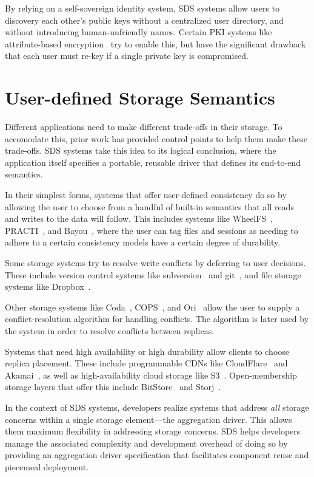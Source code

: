 By relying on a self-sovereign identity system, SDS systems allow users to
discovery each other's public keys without a centralized user directory, and
without introducing human-unfriendly names.  Certain PKI systems like
attribute-based encryption~\cite{abe} try to enable this, but have the significant
drawback that each user must re-key if a single private key is compromised.

\section{User-defined Storage Semantics}

Different applications need to make different trade-offs in their storage.  To
accomodate this, prior work has provided
control points to help them make these trade-offs.  SDS systems take
this idea to its logical conclusion, where the application itself specifies a
portable, reusable driver that defines its end-to-end semantics.

In their simplest forms, systems that offer user-defined consistency do so by
allowing the user to choose from a handful of built-in semantics that all reads
and writes to the data will follow.  This includes systems like
WheelFS~\cite{wheelfs}, PRACTI~\cite{practi}, and
Bayou~\cite{bayou}, where the user can tag files and sessions as needing to
adhere to a certain consistency models have a certain degree of
durability.

Some storage systems try to resolve write conflicts by deferring to user
decisions.  These include version control systems like
subversion~\cite{subversion} and git~\cite{git}, and file storage systems like
Dropbox~\cite{dropbox}.

Other storage systems like Coda~\cite{coda}, COPS~\cite{cops}, and
Ori~\cite{ori} allow the user to supply a conflict-resolution algorithm for
handling conflicts.  The algorithm is later used by the system in order to
resolve conflicts between replicas.

Systems that need high availability or high durability allow clients to choose
replica placement.  These include programmable CDNs like
CloudFlare~\cite{cloudflare} and Akamai~\cite{akamai}, as well as
high-availability cloud storage like S3~\cite{s3}.  Open-membership storage
layers that offer this include BitStore~\cite{bitstore} and Storj~\cite{storj}.

In the context of SDS systems, developers realize systems that address
\emph{all} storage concerns within a single storage element---the aggregation
driver.  This allows them maximum flexibility in addressing storage concerns.
SDS helps developers manage the associated complexity and development overhead
of doing so by providing an aggregation driver specification that facilitates
component reuse and piecemeal deployment.

